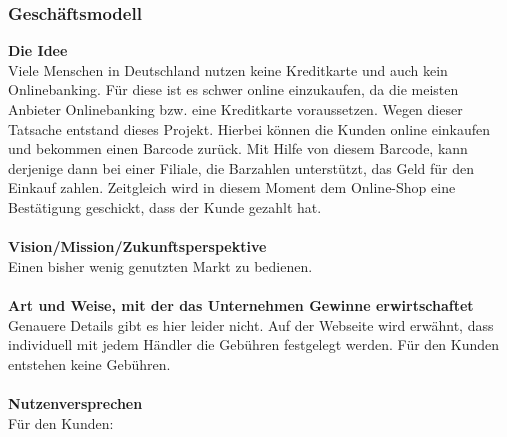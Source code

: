 \subsubsection{Geschäftsmodell}
\textbf{Die Idee}\\
Viele Menschen in Deutschland nutzen keine Kreditkarte und auch kein Onlinebanking. Für diese ist es schwer online 
einzukaufen, da die meisten Anbieter Onlinebanking bzw. eine Kreditkarte voraussetzen. Wegen dieser Tatsache entstand
dieses Projekt. Hierbei können die Kunden online einkaufen und bekommen einen Barcode zurück. Mit Hilfe von diesem
Barcode, kann derjenige dann bei einer Filiale, die Barzahlen unterstützt, das Geld für den Einkauf zahlen. Zeitgleich
wird in diesem Moment dem Online-Shop eine Bestätigung geschickt, dass der Kunde gezahlt hat.\\
\\
\textbf{Vision/Mission/Zukunftsperspektive}\\
Einen bisher wenig genutzten Markt zu bedienen.\\
\\
\textbf{Art und Weise, mit der das Unternehmen Gewinne erwirtschaftet}\\
Genauere Details gibt es hier leider nicht. Auf der Webseite wird erwähnt, dass individuell mit jedem Händler die 
Gebühren festgelegt werden. Für den Kunden entstehen keine Gebühren.\\
\\
\textbf{Nutzenversprechen}\\
Für den Kunden:\\

